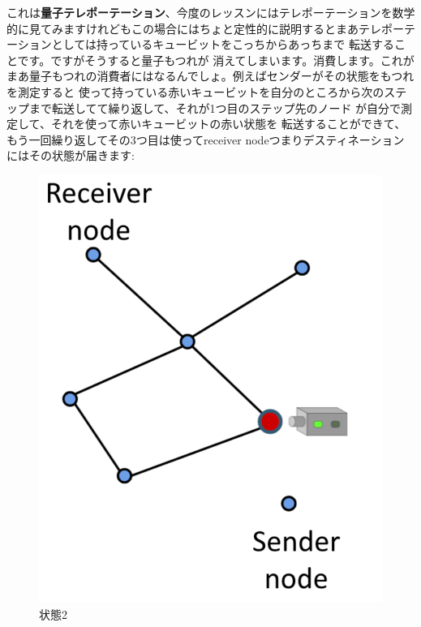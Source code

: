 これは\textbf{量子テレポーテーション}、今度のレッスンにはテレポーテーションを数学的に見てみますけれどもこの場合にはちょと定性的に説明するとまあテレポーテーションとしては持っているキュービットをこっちからあっちまで
転送することです。ですがそうすると量子もつれが
消えてしまいます。消費します。これがまあ量子もつれの消費者にはなるんでしょ。例えばセンダーがその状態をもつれを測定すると
使って持っている赤いキュービットを自分のところから次のステップまで転送してて繰り返して、それが1つ目のステップ先のノード
が自分で測定して、それを使って赤いキュービットの赤い状態を
転送することができて、もう一回繰り返してその3つ目は使ってreceiver
nodeつまりデスティネーションにはその状態が届きます:
\begin{figure}[H]
  \centering
  \begin{minipage}[b]{0.3\textwidth}
    \includegraphics[width=\textwidth]{lesson4/network_state2.pdf}
    \caption{状態2}
  \end{minipage}
  \hfill
  \begin{minipage}[b]{0.3\textwidth}

\end{minipage}
\end{figure}
